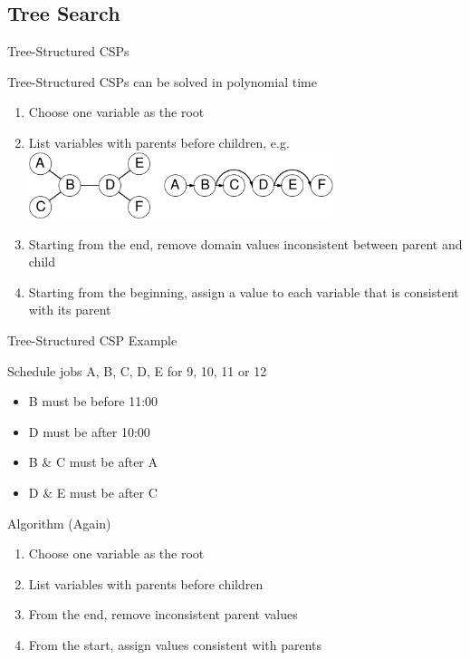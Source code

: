 \documentclass[14pt]{beamer}
\begin{document}
\subsection{Tree Search}
\begin{frame}{Tree-Structured CSPs}
	\begin{block}{Tree-Structured CSPs can be solved in polynomial time}
		\begin{enumerate}
			\item Choose one variable as the root
			\item List variables with parents before children, e.g.
				\includegraphics[width=3.5in]{tree-csp-2.pdf}
			\item Starting from the end, remove domain values inconsistent between parent and child
			\item Starting from the beginning, assign a value to each variable that is consistent with its parent
		\end{enumerate}
	\end{block}
\end{frame}
\begin{frame}{Tree-Structured CSP Example}
	\begin{block}{Schedule jobs A, B, C, D, E for 9, 10, 11 or 12}
		\begin{itemize}
			\item B must be before 11:00
			\item D must be after 10:00
			\item B \& C must be after A
			\item D \& E must be after C
		\end{itemize}
	\end{block}
	\begin{block}{Algorithm (Again)}
		\begin{enumerate}
			\item Choose one variable as the root
			\item List variables with parents before children
			\item From the end, remove inconsistent parent values
			\item From the start, assign values consistent with parents
		\end{enumerate}
	\end{block}
\end{frame}
\end{document}

